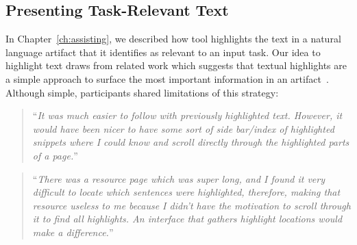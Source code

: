 











\subsection{Presenting Task-Relevant Text}
\label{cp7:info-viz}




In Chapter~\ref{ch:assisting}, we described how \acs{tool}
highlights the text in a natural language artifact that it identifies 
as relevant to an input task. Our idea to highlight text 
draws from related work which suggests that textual highlights 
are a simple approach to surface the most important information in 
an artifact~\cite{Robillard2015,nadi2020}. 
Although simple, participants shared limitations of 
this strategy:



\smallskip
\begin{quote}
``\textit{It was much easier to follow with previously highlighted text.  
    However, it would have been nicer to have some sort of side bar/index of highlighted snippets
    where I could know and scroll directly through the highlighted parts of a page.}''
\end{quote}



\smallskip
\begin{quote}
``\textit{There was a resource page which was super long, and I found it very difficult to locate which sentences were highlighted, therefore, making that resource useless to me because I didn't have the motivation to scroll through it to find all highlights. An interface that gathers highlight locations would make a difference.}''
\end{quote}


